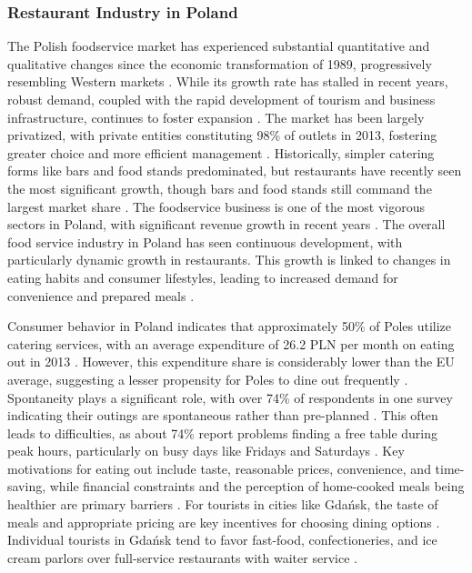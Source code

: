 \documentclass{article}
\begin{document}
\subsubsection{Restaurant Industry in Poland}
The Polish foodservice market has experienced substantial quantitative and qualitative changes since the economic transformation of 1989, progressively resembling Western markets \parencite{kowalczuk2015eating}. While its growth rate has stalled in recent years, robust demand, coupled with the rapid development of tourism and business infrastructure, continues to foster expansion \parencite{kowalczuk2015eating}. The market has been largely privatized, with private entities constituting 98\% of outlets in 2013, fostering greater choice and more efficient management \parencite{kowalczuk2015eating}. Historically, simpler catering forms like bars and food stands predominated, but restaurants have recently seen the most significant growth, though bars and food stands still command the largest market share \parencite{kowalczuk2015eating}. The foodservice business is one of the most vigorous sectors in Poland, with significant revenue growth in recent years \parencite{gheribi2017foodservice}. The overall food service industry in Poland has seen continuous development, with particularly dynamic growth in restaurants. This growth is linked to changes in eating habits and consumer lifestyles, leading to increased demand for convenience and prepared meals \parencite{kowrygo2011development}.

Consumer behavior in Poland indicates that approximately 50\% of Poles utilize catering services, with an average expenditure of 26.2 PLN per month on eating out in 2013 \parencite{kowalczuk2015eating}. However, this expenditure share is considerably lower than the EU average, suggesting a lesser propensity for Poles to dine out frequently \parencite{kowalczuk2015eating}. Spontaneity plays a significant role, with over 74\% of respondents in one survey indicating their outings are spontaneous rather than pre-planned \parencite{kowalczuk2015eating}. This often leads to difficulties, as about 74\% report problems finding a free table during peak hours, particularly on busy days like Fridays and Saturdays \parencite{kowalczuk2015eating}. Key motivations for eating out include taste, reasonable prices, convenience, and time-saving, while financial constraints and the perception of home-cooked meals being healthier are primary barriers \parencite{kowalczuk2015eating}. For tourists in cities like Gdańsk, the taste of meals and appropriate pricing are key incentives for choosing dining options \parencite{pilis2022food}. Individual tourists in Gdańsk tend to favor fast-food, confectioneries, and ice cream parlors over full-service restaurants with waiter service \parencite{pilis2022food}.
\end{document}
